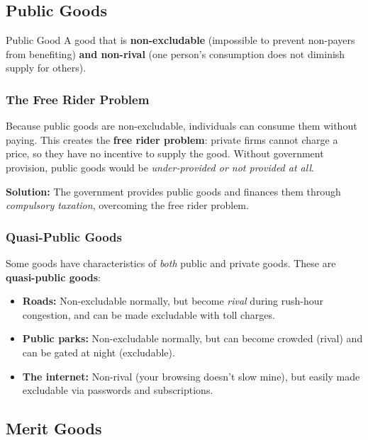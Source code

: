 \documentclass[11pt, a4paper, twoside]{book}
\begin{document}
\subsection{Public Goods}

\begin{keyterm}{Public Good}
A good that is \textbf{non-excludable} (impossible to prevent non-payers from benefiting) \textbf{and non-rival} (one person's consumption does not diminish supply for others).
\end{keyterm}

\subsubsection{The Free Rider Problem}

\begin{coreidea}
Because public goods are non-excludable, individuals can consume them without paying. This creates the \textbf{free rider problem}: private firms cannot charge a price, so they have no incentive to supply the good. Without government provision, public goods would be \emph{under-provided or not provided at all}.
\end{coreidea}

\textbf{Solution:} The government provides public goods and finances them through \emph{compulsory taxation}, overcoming the free rider problem.

\subsubsection{Quasi-Public Goods}

Some goods have characteristics of \emph{both} public and private goods. These are \textbf{quasi-public goods}:

\begin{itemize}
  \item \textbf{Roads:} Non-excludable normally, but become \emph{rival} during rush-hour congestion, and can be made excludable with toll charges.
  \item \textbf{Public parks:} Non-excludable normally, but can become crowded (rival) and can be gated at night (excludable).
  \item \textbf{The internet:} Non-rival (your browsing doesn't slow mine), but easily made excludable via passwords and subscriptions.
\end{itemize}

\subsection{Merit Goods}
\end{document}
